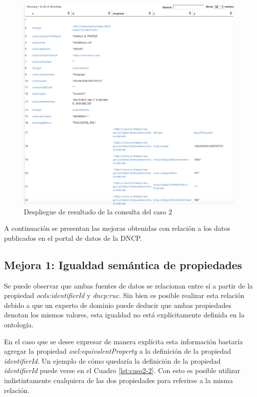  \begin{figure}[ht!]
    \centering
    \includegraphics[width=150mm]{figuras/caso2Resultado.png}
    \caption{Despliegue de resultado de la consulta del caso 2}
    \label{img:caso2Resultado}
 \end{figure}



A continuación se presentan las mejoras obtenidas con relación a los datos publicados en el portal de datos de la DNCP.
 
 \subsection{Mejora 1: Igualdad semántica de propiedades}
 Se puede observar que ambas fuentes de datos se relacionan entre sí a partir de la propiedad \textit{ocds:identifierId} y \textit{dncp:ruc}. Sin bien es posible realizar esta relación debido a que un experto de dominio puede deducir que ambas propiedades denotan los mismos valores, esta igualdad no está explícitamente definida en la ontología. 
 
 En el caso que se desee expresar de manera explícita esta información bastaría agregar la propiedad \textit{owl:equivalentProperty}  a la definición de la propiedad \textit{identifierId}. Un ejemplo de cómo quedaría la definición de la propiedad \textit{identifierId} puede verse en el Cuadro \ref{lst:caso2-2}. Con esto es posible utilizar indistintamente cualquiera de las dos propiedades para referirse a la misma relación.\hfill \break

